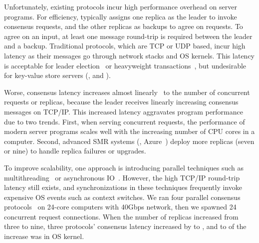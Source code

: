 Unfortunately, existing \paxos protocols incur high performance 
overhead on server programs. For efficiency, \paxos typically assigns one 
replica as the leader to invoke consensus requests, and the other replicas as 
backups to agree on requests. To agree on an input, at least one message 
round-trip is required between the leader and a backup. Traditional \paxos 
protocols, which are TCP or UDP based, incur high latency as their messages go 
through network stacks and OS kernels. This latency is acceptable for 
leader election~\cite{chubby:osdi,zookeeper} or heavyweight 
transactions~\cite{crane:sosp15,eve:osdi12}, but undesirable for
key-value store servers (\eg, \redis and \memcached).


Worse, \paxos consensus latency increases almost 
linearly~\cite{scatter:sosp11,zookeeper} to the number of concurrent requests or 
replicas, because the leader receives linearly increasing consensus 
messages on TCP/IP. This increased latency aggravates program performance due 
to two trends. First, when serving concurrent requests, the performance of 
modern server programs scales well with the increasing number of CPU cores in a 
computer. Second, advanced SMR systems (\eg, Azure~\cite{azure:book}) 
deploy more replicas (seven or nine) to handle replica failures or 
upgrades.

To improve \paxos scalability, one approach is introducing parallel techniques 
such as multithreading~\cite{zookeeper, spaxos:srds12} or asynchronous 
IO~\cite{crane:sosp15, libpaxos}. However, the high TCP/IP round-trip latency 
still exists, and synchronizations in these techniques frequently invoke 
expensive OS events such as context switches. We ran four parallel consensus 
protocols~\cite{zookeeper, spaxos:srds12, crane:sosp15, libpaxos} on 24-core 
computers with 40Gbps network, then we spawned 24 concurrent request 
connections. When the number of replicas increased from three to nine, three 
protocols' consensus latency increased by \tradlatencyincreaselow to 
\tradlatencyincreasehigh, and \systemcostlow to \systemcosthigh of the increase 
was in OS kernel.

